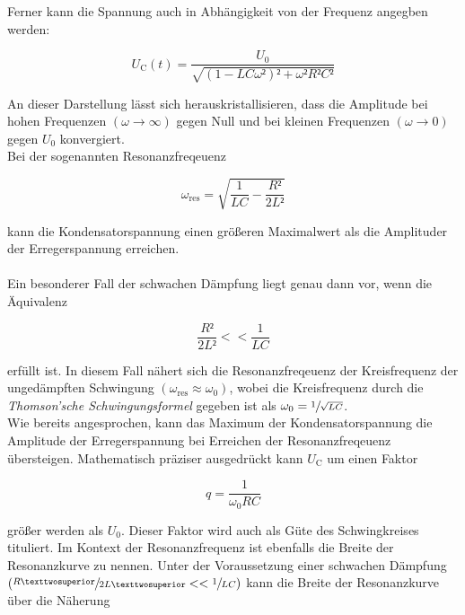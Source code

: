\noindent Ferner kann die Spannung auch in Abhängigkeit von der Frequenz angegben werden:

\begin{equation*}
    U_\text{C}(t) = \frac{U_0}{\sqrt{\left(1 - LC\omega²\right)² + \omega²R²C²}}
\end{equation*}

\noindent An dieser Darstellung lässt sich herauskristallisieren, dass die Amplitude bei hohen Frequenzen 
$\left(\omega \rightarrow \infty\right)$ gegen Null und bei kleinen Frequenzen $\left(\omega \rightarrow 0\right)$ 
gegen $U_0$ konvergiert. \\
Bei der sogenannten Resonanzfreqeuenz 

\begin{equation*}
    \omega_\text{res} = \sqrt{\frac{1}{LC} - \frac{R²}{2L²}}
\end{equation*}

\noindent kann die Kondensatorspannung einen größeren Maximalwert als die Amplituder der Erregerspannung erreichen.\\\\
Ein besonderer Fall der schwachen Dämpfung liegt genau dann vor, wenn die Äquivalenz  

\begin{equation*}
    \frac{R²}{2L²} << \frac{1}{LC}
\end{equation*}

\noindent erfüllt ist. In diesem Fall nähert sich die Resonanzfreqeuenz der Kreisfrequenz der ungedämpften Schwingung
$(\omega_\text{res} \approx \omega_0)$, wobei die Kreisfrequenz durch die \emph{Thomson'sche Schwingungsformel}\cite{Thomson}
gegeben ist als $\omega_0 = \sfrac{1}{\sqrt{LC}}$.\\
Wie bereits angesprochen, kann das Maximum der Kondensatorspannung die Amplitude der Erregerspannung bei Erreichen der 
Resonanzfreqeuenz übersteigen. Mathematisch präziser ausgedrückt kann $U_\text{C}$ um einen Faktor

\begin{equation*}
    q = \frac{1}{\omega_{0}RC}
\end{equation*}

\noindent größer werden als $U_0$. Dieser Faktor wird auch als Güte des Schwingkreises tituliert. Im Kontext der Resonanzfrequenz ist 
ebenfalls die Breite der Resonanzkurve zu nennen. Unter der Voraussetzung einer schwachen Dämpfung $\left(\sfrac{R²}{2L²} << \sfrac{1}{LC}\right)$
kann die Breite der Resonanzkurve über die Näherung

